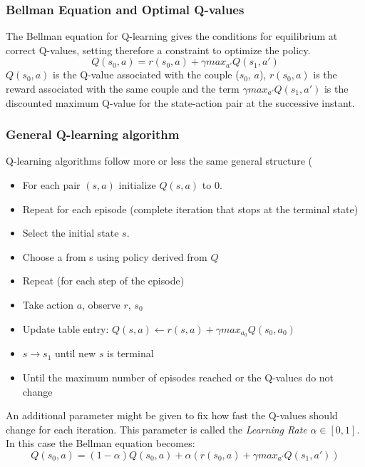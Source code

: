 \subsubsection{Bellman Equation and Optimal Q-values}

The Bellman equation for Q-learning gives the conditions for equilibrium at correct Q-values, setting therefore a constraint to optimize the policy.
\begin{equation}
Q(s_{0}, a) = r(s_{0},a ) + \gamma  max_{a'}Q(s_1, a') 
\end{equation}
$Q(s_{0}, a)$ is the Q-value associated with the couple ($s_{0}$, $a$), $r(s_{0},a )$ is the reward associated with the same couple and the term $\gamma  max_{a'}Q(s_1, a')$ is the discounted maximum Q-value for the state-action pair at the successive instant.

\subsubsection{General Q-learning algorithm}

Q-learning algorithms follow more or less the same general structure (%
\begin{itemize}
    \item For each pair $(s, a)$ initialize $Q(s, a)$ to 0.
    \item Repeat for each episode (complete iteration that stops at the terminal state)
    \item Select the initial state $s$.
    \item Choose a from s using policy derived from $Q$
    \item Repeat (for each step of the episode)
    \item Take action $a$, observe $r$, $s_{0}$ 
    \item Update table entry: $Q(s,a) \leftarrow r(s,a) + \gamma max_{a_{0}}Q(s_{0},a_{0})$
    \item $s \rightarrow{} s_{1}$ until new $s$ is terminal
    \item Until the maximum number of episodes reached or the Q-values do not change
\end{itemize}

An additional parameter might be given to fix how fast the Q-values should change for each iteration. This parameter is called the \emph{Learning Rate} $\alpha \in [0,1]$. In this case the Bellman equation becomes:
\begin{equation}
Q(s_{0}, a) = (1-\alpha)Q(s_{0}, a) + \alpha(r(s_{0},a ) + \gamma  max_{a'}Q(s_1, a')) 
\end{equation}

